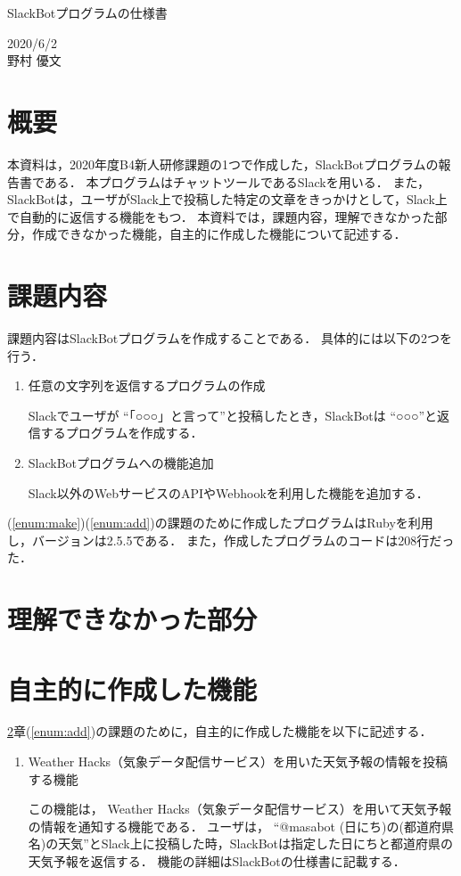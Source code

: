 \documentclass[12pt]{jsarticle}
\begin{document}
\begin{center}
{\LARGE SlackBotプログラムの仕様書}
\end{center}

\begin{flushright}
  2020/6/2\\
  野村 優文
\end{flushright}
\section{概要}
\label{sec:introduction}
本資料は，2020年度B4新人研修課題の1つで作成した，SlackBotプログラムの報告書である．
本プログラムはチャットツールであるSlack\cite{Slack}を用いる．
また，SlackBotは，ユーザがSlack上で投稿した特定の文章をきっかけとして，Slack上で自動的に返信する機能をもつ．
本資料では，課題内容，理解できなかった部分，作成できなかった機能，自主的に作成した機能について記述する．

\section{課題内容}\label{sec:content}
課題内容はSlackBotプログラムを作成することである．
具体的には以下の2つを行う．

\begin{enumerate}
\item\label{enum:make} 任意の文字列を返信するプログラムの作成

  Slackでユーザが ``「○○○」と言って''と投稿したとき，SlackBotは ``○○○''と返信するプログラムを作成する．
  
\item\label{enum:add} SlackBotプログラムへの機能追加

  Slack以外のWebサービスのAPIやWebhookを利用した機能を追加する．
\end{enumerate}
(\ref{enum:make})(\ref{enum:add})の課題のために作成したプログラムはRubyを利用し，バージョンは2.5.5である．
また，作成したプログラムのコードは208行だった．

\section{理解できなかった部分}



\section{自主的に作成した機能}
\ref{sec:content}章(\ref{enum:add})の課題のために，自主的に作成した機能を以下に記述する．
\begin{enumerate}
  \item Weather Hacks（気象データ配信サービス）\cite{WeatherHacks}を用いた天気予報の情報を投稿する機能

  この機能は， Weather Hacks（気象データ配信サービス）を用いて天気予報の情報を通知する機能である．
  ユーザは， ``@masabot (日にち)の(都道府県名)の天気''とSlack上に投稿した時，SlackBotは指定した日にちと都道府県の天気予報を返信する．
  機能の詳細はSlackBotの仕様書に記載する．
\end{enumerate}
\end{document}
